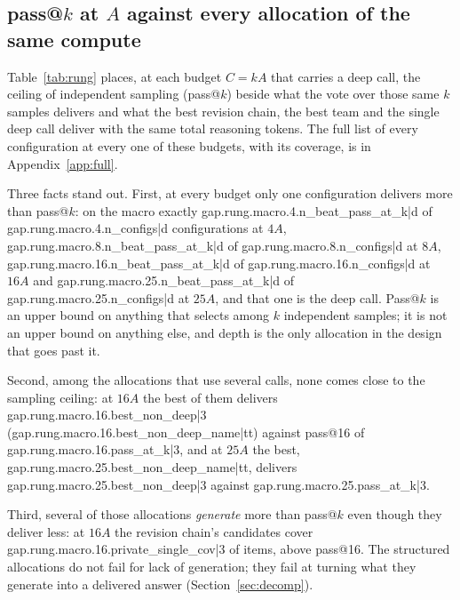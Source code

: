 \documentclass[11pt]{article}
\begin{document}
{{{{\subsection{pass@\texorpdfstring{$k$}{k} at \texorpdfstring{$A$}{A} against every allocation of the same compute}
\label{sec:passk}

Table~\ref{tab:rung} places, at each budget $C = kA$ that carries a deep call, the ceiling of independent
sampling (pass@$k$) beside what the vote over those same $k$ samples delivers and what the best revision
chain, the best team and the single deep call deliver with the same total reasoning tokens. The full list
of every configuration at every one of these budgets, with its coverage, is in Appendix~\ref{app:full}.

\begin{table}[htbp]
\centering
\small

\caption{Macro accuracy at equal realized compute $C = kA$. pass@$k$ is the generation ceiling of $k$
independent 1024-token samples; every other column is delivered accuracy (coverage columns are the share of
items on which the configuration's own candidates, over all its rounds, contained a correct answer).}
\label{tab:rung}
\end{table}

Three facts stand out. First, at every budget only one configuration delivers more than pass@$k$: on the
macro exactly {{gap.rung.macro.4.n_beat_pass_at_k|d}} of {{gap.rung.macro.4.n_configs|d}} configurations at
$4A$, {{gap.rung.macro.8.n_beat_pass_at_k|d}} of {{gap.rung.macro.8.n_configs|d}} at $8A$,
{{gap.rung.macro.16.n_beat_pass_at_k|d}} of {{gap.rung.macro.16.n_configs|d}} at $16A$ and
{{gap.rung.macro.25.n_beat_pass_at_k|d}} of {{gap.rung.macro.25.n_configs|d}} at $25A$, and that one is the
deep call. Pass@$k$ is an upper bound on anything that selects among $k$ independent samples; it is not an
upper bound on anything else, and depth is the only allocation in the design that goes past it.

Second, among the allocations that use several calls, none comes close to the sampling ceiling: at $16A$ the
best of them delivers {{gap.rung.macro.16.best_non_deep|3}} ({{gap.rung.macro.16.best_non_deep_name|tt}})
against pass@16 of {{gap.rung.macro.16.pass_at_k|3}}, and at $25A$ the best,
{{gap.rung.macro.25.best_non_deep_name|tt}}, delivers {{gap.rung.macro.25.best_non_deep|3}} against
{{gap.rung.macro.25.pass_at_k|3}}.

Third, several of those allocations \emph{generate} more than pass@$k$ even though they deliver less: at
$16A$ the revision chain's candidates cover {{gap.rung.macro.16.private_single_cov|3}} of items, above
pass@16. The structured allocations do not fail for lack of generation; they fail at turning what they
generate into a delivered answer (Section~\ref{sec:decomp}).

}}}}
\end{document}

